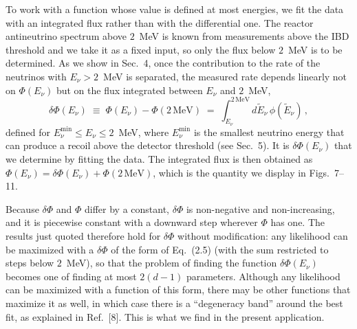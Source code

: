 

To work with a function whose value is defined at most energies, we fit the data with an
integrated flux rather than with the differential one. The reactor antineutrino spectrum
above $2$~MeV is known from measurements above the IBD threshold and we take it as a fixed
input, so only the flux below $2$~MeV is to be determined. As we show in Sec.~4, once the
contribution to the rate of the neutrinos with $E_\nu > 2$~MeV is separated, the measured
rate depends linearly not on $\Phi(E_\nu)$ but on the flux integrated between $E_\nu$ and
$2$~MeV,
\begin{equation}
\delta\Phi(E_\nu)\;\equiv\;\Phi(E_\nu)-\Phi(2\,\mathrm{MeV})
\;=\;\int_{E_\nu}^{2\,\mathrm{MeV}}\! d\tilde E_\nu\,\phi(\tilde E_\nu)\,,
\end{equation}
defined for $E_\nu^{\min}\le E_\nu\le 2$~MeV, where $E_\nu^{\min}$ is the smallest neutrino
energy that can produce a recoil above the detector threshold (see Sec.~5). It is
$\delta\Phi(E_\nu)$ that we determine by fitting the data. The integrated flux is then
obtained as $\Phi(E_\nu)=\delta\Phi(E_\nu)+\Phi(2\,\mathrm{MeV})$, which is the quantity we
display in Figs.~7--11.

Because $\delta\Phi$ and $\Phi$ differ by a constant, $\delta\Phi$ is non-negative and
non-increasing, and it is piecewise constant with a downward step wherever $\Phi$ has one.
The results just quoted therefore hold for $\delta\Phi$ without modification: any likelihood
can be maximized with a $\delta\Phi$ of the form of Eq.~(2.5) (with the sum restricted to
steps below $2$~MeV), so that the problem of finding the function $\delta\Phi(E_\nu)$ becomes
one of finding at most $2(d-1)$ parameters. Although any likelihood can be maximized with
a function of this form, there may be other functions that maximize it as well, in which case
there is a ``degeneracy band'' around the best fit, as explained in Ref.~[8]. This is what we
find in the present application.

